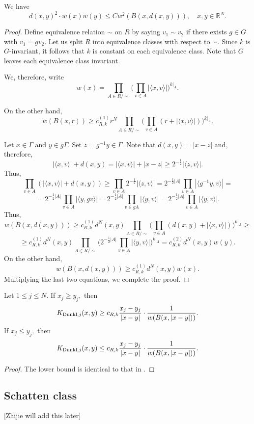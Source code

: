 \documentclass{amsart}
\numberwithin{equation}{section}
\begin{document}
\begin{lemma}\label{for sufficiency auxiliary lemma} We have
$$d(x,y)^2\cdot w(x)w(y)\leq Cw^2(B(x,d(x,y))),\quad x,y\in\mathbb{R}^N.$$
\end{lemma}
\begin{proof} Define equivalence relation $\sim$ on $R$ by saying $v_1\sim v_2$ if there exists $g\in G$ with $v_1=gv_2.$ Let us split $R$ into equivalence classes with respect to $\sim.$ Since $k$ is $G$-invariant, it follows that $k$ is constant on each equivalence class. Note that $G$ leaves each equivalence class invariant.

We, therefore, write
$$w(x)=\prod_{A\in R/\sim}\big(\prod_{v\in A}|\langle x,v\rangle|\big)^{k|_A}.$$

On the other hand,
$$w(B(x,r))\geq c_{R,k}^{(1)}r^N\prod_{A\in R/\sim}\big(\prod_{v\in A}(r+|\langle x,v\rangle|)\big)^{k|_A}.$$

Let $x\in\Gamma$ and $y\in g\Gamma.$ Set $z=g^{-1}y\in\Gamma.$ Note that $d(x,y)=|x-z|$ and, therefore,
$$|\langle x,v\rangle|+d(x,y)=|\langle x,v\rangle|+|x-z|\geq 2^{-\frac12}|\langle z,v\rangle|.$$
Thus,
$$\prod_{v\in A}(|\langle x,v\rangle|+d(x,y))\geq\prod_{v\in A}2^{-\frac12}|\langle z,v\rangle|=2^{-\frac12|A|}\prod_{v\in A}|\langle g^{-1}y,v\rangle|=$$
$$=2^{-\frac12|A|}\prod_{v\in A}|\langle y,gv\rangle|=2^{-\frac12|A|}\prod_{v\in gA}|\langle y,v\rangle|=2^{-\frac12|A|}\prod_{v\in A}|\langle y,v\rangle|.$$
Thus,
$$w(B(x,d(x,y)))\geq c_{R,k}^{(1)}d^N(x,y)\prod_{A\in R/\sim}\big(\prod_{v\in A}(d(x,y)+|\langle x,v\rangle|)\big)^{k|_A}\geq$$
$$\geq c_{R,k}^{(1)}d^N(x,y)\prod_{A\in R/\sim}\big(2^{-\frac12|A|}\prod_{v\in A}|\langle y,v\rangle|\big)^{k|_A}=c_{R,k}^{(2)}d^N(x,y)w(y).$$
On the other hand,
$$w(B(x,d(x,y)))\geq c_{R,k}^{(1)}d^N(x,y)w(x).$$
Multiplying the last two equations, we complete the proof.
\end{proof}

\begin{lemma}\label{nondegenerate} Let $1\leq j\leq N.$ If $x_j\geq y_j,$ then
$$K_{{\rm Dunkl},j}(x,y)\geq c_{R,k}\frac{x_j-y_j}{|x-y|}\cdot\frac1{w(B(x,|x-y|))}.$$
If $x_j\leq y_j,$ then
$$K_{{\rm Dunkl},j}(x,y)\leq c_{R,k}\frac{x_j-y_j}{|x-y|}\cdot\frac1{w(B(x,|x-y|))}.$$
\end{lemma}
\begin{proof} The lower bound is identical to that in \cite[Theorem 1.2]{MR4733961}.
\end{proof}

\subsection{Schatten class}
{\color{red}[Zhijie will add this later]}
\end{document}
